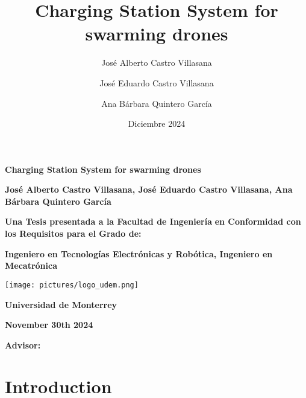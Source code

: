 \documentclass[11pt]{report} %
\title{Charging Station System for swarming drones} %
\author{José Alberto Castro Villasana \and José Eduardo Castro Villasana \and Ana Bárbara Quintero García} %
\date{Diciembre 2024} %
\begin{document}
\begin{titlepage}
    \centering
    \vspace*{1cm}
    
    {\Huge\textbf{Charging Station System for swarming drones}} %
    
    \vspace{2.5cm} %
    {\Large\textbf{José Alberto Castro Villasana, José Eduardo Castro Villasana, Ana Bárbara Quintero García}} %
    
    \vfill
    
    {\large\textbf{Una Tesis presentada a la Facultad de Ingeniería}} %
    {\large\textbf{en Conformidad con los Requisitos para el Grado de:}} %
    
    \vspace{0.2cm}
    {\large\textbf{Ingeniero en Tecnologías Electrónicas y Robótica, Ingeniero en Mecatrónica}} %
    
    \vspace{2cm}
    
    \texttt{[image: pictures/logo\_udem.png]} %
    
    \vspace{2cm}
    
    {\large\textbf{Universidad de Monterrey}}

    \vspace{0.2cm}
    {\large{}}

    \vspace{0.2cm}
    {\large{}} %
    
    \vspace{1.5cm}
    {\large\textbf{November 30th 2024}} %
    
    \vfill
    {\large\textbf{Advisor:} } %
    
\end{titlepage}

\tableofcontents
\newpage

\onehalfspacing%

\chapter{Introduction} %
\end{document}
